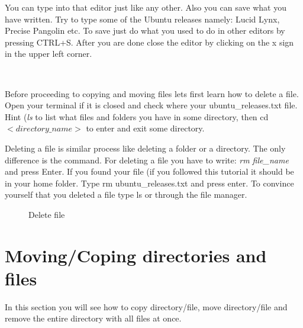 \par \noindent You can type into that editor just like any other. Also you can save what you have written. Try to type some of the Ubuntu releases namely: Lucid Lynx, Precise Pangolin etc. To save just do what you used to do in other editors by pressing CTRL+S. After you are done close the editor by clicking on the x sign in the upper left corner.  \\

\par \noindent {} \\

\par \noindent Before proceeding to copying and moving files lets first learn how to delete a file. Open your terminal if it is closed and check where your ubuntu\_releases.txt file. Hint (\textit{ls} to list what files and folders  you have in some directory, then cd  $<directory\_name>$ to enter and exit some directory.  \\

\par \noindent Deleting a file is similar process like deleting a folder or a directory. The only difference is the command. For deleting a file you have to write: \textit{rm file\_name} and press Enter. If you found your file (if you followed this tutorial it should be in your home folder. Type rm ubuntu\_releases.txt and press enter. To convince yourself that you deleted a file type ls or through the file manager. 

\begin{figure}[h!]	
	\centering
	\caption{Delete file}	
	\label{fig:rm1}	
\end{figure}

\section{Moving/Coping directories and files} 
In this section you will see how to copy directory/file, move directory/file and remove the entire directory with all files at once. \\

